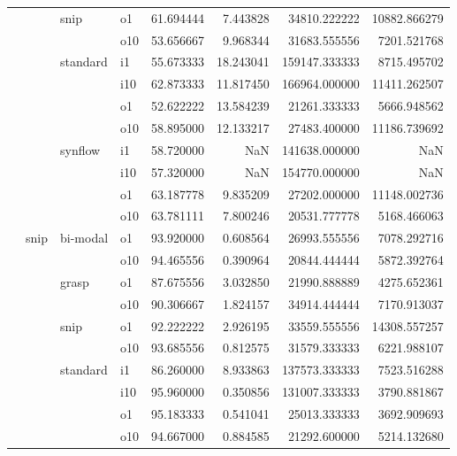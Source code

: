 \begin{longtable}{llllrrrr}
      &     & snip & o1 &  61.694444 &   7.443828 &     34810.222222 &  10882.866279 \\
      &     &         & o10 &  53.656667 &   9.968344 &     31683.555556 &   7201.521768 \\
      &     & standard & i1 &  55.673333 &  18.243041 &    159147.333333 &   8715.495702 \\
      &     &         & i10 &  62.873333 &  11.817450 &    166964.000000 &  11411.262507 \\
      &     &         & o1 &  52.622222 &  13.584239 &     21261.333333 &   5666.948562 \\
      &     &         & o10 &  58.895000 &  12.133217 &     27483.400000 &  11186.739692 \\
      &     & synflow & i1 &  58.720000 &        NaN &    141638.000000 &           NaN \\
      &     &         & i10 &  57.320000 &        NaN &    154770.000000 &           NaN \\
      &     &         & o1 &  63.187778 &   9.835209 &     27202.000000 &  11148.002736 \\
      &     &         & o10 &  63.781111 &   7.800246 &     20531.777778 &   5168.466063 \\
      & snip & bi-modal & o1 &  93.920000 &   0.608564 &     26993.555556 &   7078.292716 \\
      &     &         & o10 &  94.465556 &   0.390964 &     20844.444444 &   5872.392764 \\
      &     & grasp & o1 &  87.675556 &   3.032850 &     21990.888889 &   4275.652361 \\
      &     &         & o10 &  90.306667 &   1.824157 &     34914.444444 &   7170.913037 \\
      &     & snip & o1 &  92.222222 &   2.926195 &     33559.555556 &  14308.557257 \\
      &     &         & o10 &  93.685556 &   0.812575 &     31579.333333 &   6221.988107 \\
      &     & standard & i1 &  86.260000 &   8.933863 &    137573.333333 &   7523.516288 \\
      &     &         & i10 &  95.960000 &   0.350856 &    131007.333333 &   3790.881867 \\
      &     &         & o1 &  95.183333 &   0.541041 &     25013.333333 &   3692.909693 \\
      &     &         & o10 &  94.667000 &   0.884585 &     21292.600000 &   5214.132680 \\

\end{longtable}
